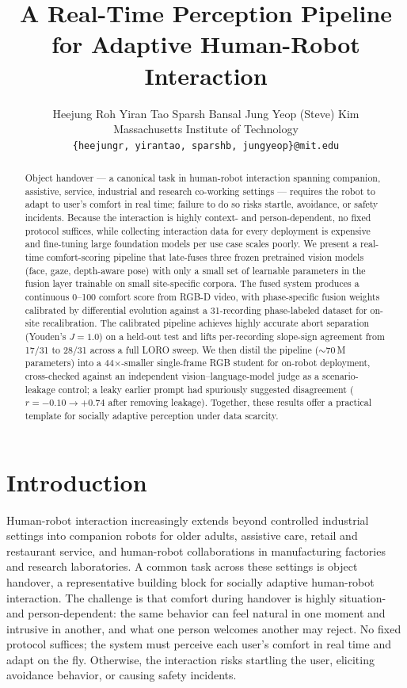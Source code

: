 \documentclass{article}
\title{A Real-Time Perception Pipeline for Adaptive Human-Robot Interaction}
\author{%
  Heejung Roh \quad Yiran Tao \quad Sparsh Bansal \quad Jung Yeop (Steve) Kim \\
  Massachusetts Institute of Technology \\
  \texttt{\{heejungr, yirantao, sparshb, jungyeop\}@mit.edu}
}
\begin{document}
\maketitle

\begin{abstract}
Object handover --- a canonical task in human-robot interaction spanning companion, assistive, service, industrial and research co-working settings --- requires the robot to adapt to user's comfort in real time; failure to do so risks startle, avoidance, or safety incidents. Because the interaction is highly context- and person-dependent, no fixed protocol suffices, while collecting interaction data for every deployment is expensive and fine-tuning large foundation models per use case scales poorly. We present a real-time comfort-scoring pipeline that late-fuses three frozen pretrained vision models (face, gaze, depth-aware pose) with only a small set of learnable parameters in the fusion layer trainable on small site-specific corpora. The fused system produces a continuous 0--100 comfort score from RGB-D video, with phase-specific fusion weights calibrated by differential evolution against a 31-recording phase-labeled dataset for on-site recalibration. The calibrated pipeline achieves highly accurate abort separation (Youden's $J = 1.0$) on a held-out test and lifts per-recording slope-sign agreement from 17/31 to 28/31 across a full LORO sweep. We then distil the pipeline ($\sim$70\,M parameters) into a 44$\times$-smaller single-frame RGB student for on-robot deployment, cross-checked against an independent vision--language-model judge as a scenario-leakage control; a leaky earlier prompt had spuriously suggested disagreement ($r = -0.10 \rightarrow +0.74$ after removing leakage). Together, these results offer a practical template for socially adaptive perception under data scarcity.
\end{abstract}

\section{Introduction}

\label{sec:intro}

Human-robot interaction increasingly extends beyond controlled industrial settings into companion robots for older adults, assistive care, retail and restaurant service, and human-robot collaborations in manufacturing factories and research laboratories. A common task across these settings is object handover, a representative building block for socially adaptive human-robot interaction. The challenge is that comfort during handover is highly situation- and person-dependent: the same behavior can feel natural in one moment and intrusive in another, and what one person welcomes another may reject. No fixed protocol suffices; the system must perceive each user's comfort in real time and adapt on the fly. Otherwise, the interaction risks startling the user, eliciting avoidance behavior, or causing safety incidents.
\end{document}
